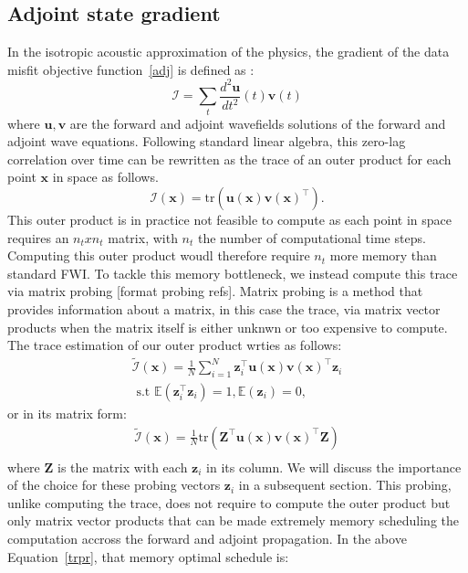 \documentclass[]{segabs}
\begin{document}
\subsection{Adjoint state gradient}\label{adjoint-state-gradient}

In the isotropic acoustic approximation of the physics, the gradient of
the data misfit objective function~\ref{adj} is defined as
\citep{haber10tremp}:
%
\begin{equation}
\mathcal{I} = \sum_t \frac{d^2 \mathbf{u}}{dt^2}(t) \mathbf{v}(t)
\label{iccc}
\end{equation}
%
 where $\mathbf{u}, \mathbf{v}$ are the forward and adjoint wavefields
solutions of the forward and adjoint wave equations. Following standard
linear algebra, this zero-lag correlation over time can be rewritten as
the trace of an outer product for each point $\mathbf{x}$ in space as
follows.
%
\begin{equation}
\mathcal{I}(\mathbf{x}) = \text{tr}(\mathbf{u}(\mathbf{x})\mathbf{v}(\mathbf{x})^\top).
\label{optr}
\end{equation}
%
 This outer product is in practice not feasible to compute as each point
in space requires an $n_t x n_t$ matrix, with $n_t$ the number of
computational time steps. Computing this outer product woudl therefore
require $n_t$ more memory than standard FWI. To tackle this memory
bottleneck, we instead compute this trace via matrix probing {[}format
probing refs{]}. Matrix probing is a method that provides information
about a matrix, in this case the trace, via matrix vector products when
the matrix itself is either unknwn or too expensive to compute. The
trace estimation of our outer product wrties as follows:
%
\begin{equation}
\begin{split}
    \tilde{\mathcal{I}}(\mathbf{x}) = \frac{1}{N} \sum_{i=1}^{N} \mathbf{z}_i^\top \mathbf{u}(\mathbf{x})\mathbf{v}(\mathbf{x})^\top \mathbf{z}_i \\
    \text{ s.t } \mathbb{E}(\mathbf{z}_i^\top \mathbf{z}_i) = 1, \mathbb{E}(\mathbf{z}_i) = 0,
\end{split}
\label{trpr}
\end{equation}
%
 or in its matrix form:
%
\begin{equation}
\begin{split}
    \tilde{\mathcal{I}}(\mathbf{x}) = \frac{1}{N} \text{tr}(\mathbf{Z}^\top \mathbf{u}(\mathbf{x}) \mathbf{v}(\mathbf{x})^\top \mathbf{Z}) \\
\end{split}
\label{trprM}
\end{equation}
%
 where $\mathbf{Z}$ is the matrix with each $\mathbf{z}_i$ in its
column. We will discuss the importance of the choice for these probing
vectors $\mathbf{z}_i$ in a subsequent section. This probing, unlike
computing the trace, does not require to compute the outer product but
only matrix vector products that can be made extremely memory scheduling
the computation accross the forward and adjoint propagation. In the
above Equation~\ref{trpr}, that memory optimal schedule is:
\end{document}
